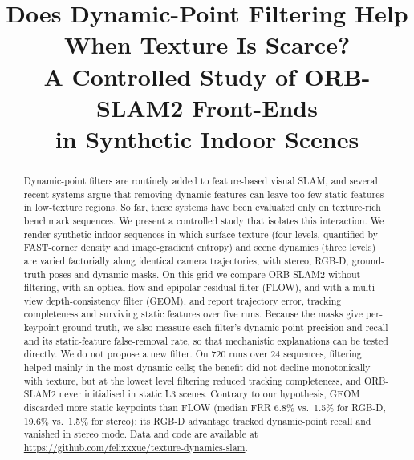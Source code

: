 \documentclass[conference]{IEEEtran}
\begin{document}
\title{Does Dynamic-Point Filtering Help When Texture Is Scarce?\\
A Controlled Study of ORB-SLAM2 Front-Ends\\ in Synthetic Indoor Scenes}

\author{%
}

\maketitle

\begin{abstract}
Dynamic-point filters are routinely added to feature-based visual SLAM, and several recent systems argue that removing dynamic features can leave too few static features in low-texture regions. So far, these systems have been evaluated only on texture-rich benchmark sequences. We present a controlled study that isolates this interaction. We render synthetic indoor sequences in which surface texture (four levels, quantified by FAST-corner density and image-gradient entropy) and scene dynamics (three levels) are varied factorially along identical camera trajectories, with stereo, RGB-D, ground-truth poses and dynamic masks. On this grid we compare ORB-SLAM2 without filtering, with an optical-flow and epipolar-residual filter (FLOW), and with a multi-view depth-consistency filter (GEOM), and report trajectory error, tracking completeness and surviving static features over five runs. Because the masks give per-keypoint ground truth, we also measure each filter's dynamic-point precision and recall and its static-feature false-removal rate, so that mechanistic explanations can be tested directly. We do not propose a new filter. On 720 runs over 24 sequences, filtering helped mainly in the most dynamic cells; the benefit did not decline monotonically with texture, but at the lowest level filtering reduced tracking completeness, and ORB-SLAM2 never initialised in static L3 scenes. Contrary to our hypothesis, GEOM discarded more static keypoints than FLOW (median FRR 6.8\% vs.\ 1.5\% for RGB-D, 19.6\% vs.\ 1.5\% for stereo); its RGB-D advantage tracked dynamic-point recall and vanished in stereo mode. Data and code are available at \url{https://github.com/felixxxue/texture-dynamics-slam}.
\end{abstract}
\end{document}

